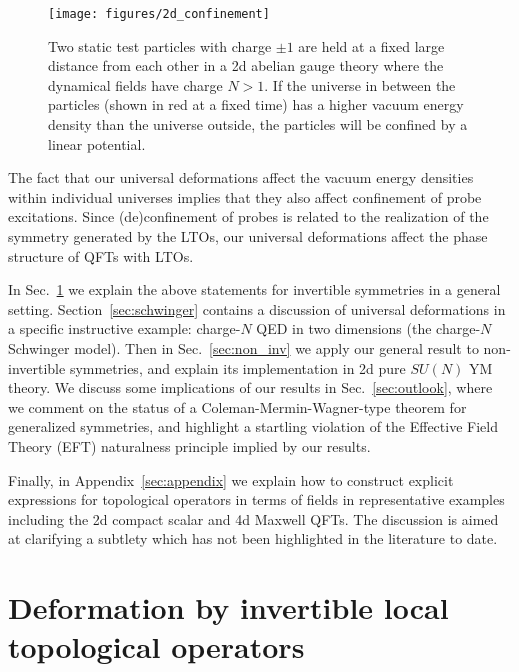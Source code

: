 \documentclass[11pt]{article}
\begin{document}
\begin{figure}[h]
\centering
\texttt{[image: figures/2d\_confinement]}
\caption{Two static test particles with charge $\pm 1$ are held at a fixed large distance from each other in a 2d abelian gauge theory where the dynamical fields have charge $N>1$.  If the universe in between the particles (shown in red at a fixed time) has a higher vacuum energy  density than the universe outside, the particles will be confined by a linear potential. } 
\label{fig:charged_particles} 
\end{figure}


The fact that our universal deformations affect the vacuum energy densities
within individual universes implies that they also affect confinement of probe
excitations.  Since (de)confinement of probes is related to the realization of
the symmetry generated by the LTOs, our universal deformations affect the phase
structure of QFTs with LTOs. 

In Sec.~\ref{sec:invertible_deformation} we explain the above statements for invertible symmetries in a general setting.  
Section~\ref{sec:schwinger} contains a discussion of universal deformations in a specific instructive example: charge-$N$ QED in two dimensions (the charge-$N$ Schwinger model). Then
in Sec.~\ref{sec:non_inv} we apply our general result to
non-invertible symmetries, and explain its implementation in 2d pure $SU(N)$ YM theory.  We 
discuss some implications of our results in Sec.~\ref{sec:outlook}, where we comment on the status of a Coleman-Mermin-Wagner-type theorem for generalized symmetries, and highlight a startling violation of the Effective Field Theory (EFT) naturalness principle implied by our results.  

Finally, in Appendix~\ref{sec:appendix} we explain how to construct explicit expressions for topological operators in terms of fields in representative examples including the 2d compact scalar and 4d Maxwell QFTs.  The discussion is aimed at clarifying a subtlety which has not been highlighted in the literature to date.



\section{Deformation by invertible local topological operators}
\label{sec:invertible_deformation}
\end{document}
